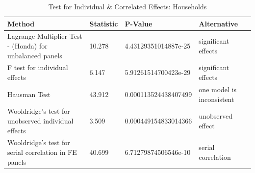 \begin{table}[ht]
\centering
\caption{ Test for Individual & Correlated Effects: Households} 
\begingroup\small
\begin{tabular}{llll}
  \toprule
Method & Statistic & P-Value & Alternative \\ 
  \midrule
Lagrange Multiplier Test -  (Honda) for unbalanced panels & 10.278 & 4.43129351014887e-25 & significant effects \\ 
  F test for individual effects & 6.147 & 5.91261514700423e-29 & significant effects \\ 
  Hausman Test & 43.912 & 0.000113524438407499 & one model is inconsistent \\ 
  Wooldridge's test for unobserved individual effects & 3.509 & 0.000449154833014366 & unobserved effect \\ 
  Wooldridge's test for serial correlation in FE panels & 40.699 & 6.71279874506546e-10 & serial correlation \\ 
   \bottomrule
\end{tabular}
\endgroup
\end{table}
